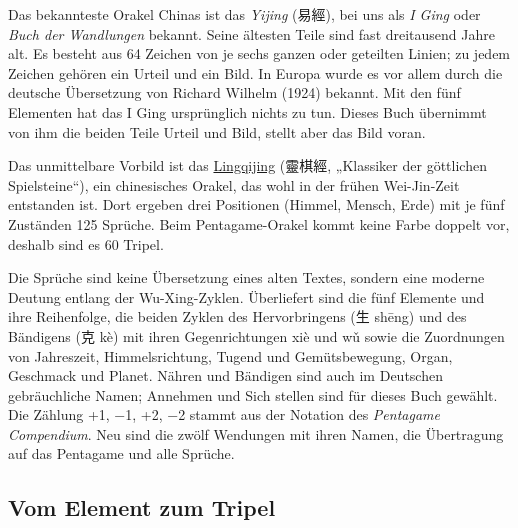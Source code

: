 \documentclass[12pt,paper=a5,DIV=13,headings=small,twoside=true,open=any]{scrbook}
\begin{document}
Das bekannteste Orakel Chinas ist das \textit{Yijing} ({\cjk 易經}), bei uns als \textit{I Ging} oder \textit{Buch der Wandlungen} bekannt. Seine ältesten Teile sind fast dreitausend Jahre alt. Es besteht aus 64 Zeichen von je sechs ganzen oder geteilten Linien; zu jedem Zeichen gehören ein Urteil und ein Bild. In Europa wurde es vor allem durch die deutsche Übersetzung von Richard Wilhelm (1924) bekannt. Mit den fünf Elementen hat das I Ging ursprünglich nichts zu tun. Dieses Buch übernimmt von ihm die beiden Teile Urteil und Bild, stellt aber das Bild voran.

Das unmittelbare Vorbild ist das \href{https://en.wikipedia.org/wiki/Lingqijing}{Lingqijing} ({\cjk 靈棋經}, „Klassiker der göttlichen Spielsteine“), ein chinesisches Orakel, das wohl in der frühen Wei-Jin-Zeit entstanden ist. Dort ergeben drei Positionen (Himmel, Mensch, Erde) mit je fünf Zuständen 125 Sprüche. Beim Pentagame-Orakel kommt keine Farbe doppelt vor, deshalb sind es 60 Tripel.

Die Sprüche sind keine Übersetzung eines alten Textes, sondern eine moderne Deutung entlang der Wu-Xing-Zyklen. Überliefert sind die fünf Elemente und ihre Reihenfolge, die beiden Zyklen des Hervorbringens ({\cjk 生} shēng) und des Bändigens ({\cjk 克} kè) mit ihren Gegenrichtungen xiè und wǔ sowie die Zuordnungen von Jahreszeit, Himmelsrichtung, Tugend und Gemütsbewegung, Organ, Geschmack und Planet. Nähren und Bändigen sind auch im Deutschen gebräuchliche Namen; Annehmen und Sich stellen sind für dieses Buch gewählt. Die Zählung +1, −1, +2, −2 stammt aus der Notation des \textit{Pentagame Compendium}. Neu sind die zwölf Wendungen mit ihren Namen, die Übertragung auf das Pentagame und alle Sprüche.


\subsection*{Vom Element zum Tripel}
\end{document}
